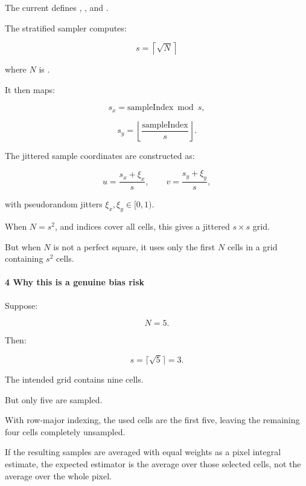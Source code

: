 The current  defines , , and .

The stratified sampler computes:

\[
 s=\left\lceil\sqrt N\right\rceil
\]

where \(N\) is .

It then maps:

\[
 s_x=\text{sampleIndex}\bmod s,
\]

\[
 s_y=\left\lfloor\frac{\text{sampleIndex}}s\right\rfloor.
\]

The jittered sample coordinates are constructed as:

\[
 u=\frac{s_x+\xi_x}{s}, \qquad v=\frac{s_y+\xi_y}{s},
\]

with pseudorandom jitters \(\xi_x,\xi_y\in[0,1)\).

When \(N=s^2\), and indices cover all cells, this gives a jittered \(s\times s\) grid.

But when \(N\) is not a perfect square, it uses only the first \(N\) cells in a grid containing \(s^2\) cells.

\paragraph{4 Why this is a genuine bias risk}\label{02-foundations-ii-ch039-why-this-is-a-genuine-bias-risk}

\hypertarget{02-foundations-ii-ch039-why-this-is-a-genuine-bias-risk}{}

Suppose:

\[
 N=5.
\]

Then:

\[
 s=\lceil\sqrt5\rceil=3.
\]

The intended grid contains nine cells.

But only five are sampled.

With row-major indexing, the used cells are the first five, leaving the remaining four cells completely unsampled.

If the resulting samples are averaged with equal weights as a pixel integral estimate, the expected estimator is the average over those selected cells, not the average over the whole pixel.

